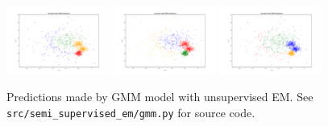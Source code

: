 \begin{answer}
  \begin{figure}[H]
    \centering
    \includegraphics[width=0.3\textwidth]{../src/semi_supervised_em/pred_0.pdf}
    \includegraphics[width=0.3\textwidth]{../src/semi_supervised_em/pred_1.pdf}
    \includegraphics[width=0.3\textwidth]{../src/semi_supervised_em/pred_2.pdf}
    \caption{Predictions made by GMM model with unsupervised EM. See \texttt{src/semi\_supervised\_em/gmm.py} for source code.}
  \end{figure}
\end{answer}
